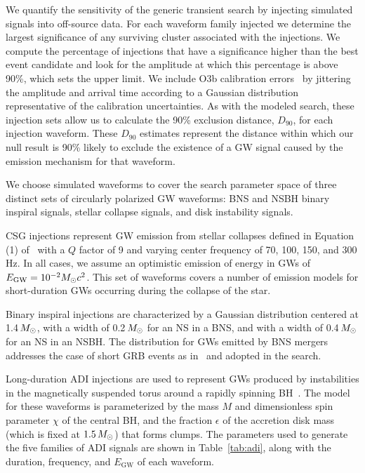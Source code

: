 We quantify the sensitivity of the generic transient search by injecting simulated signals into off-source data.
For each waveform family injected we determine the largest significance of any surviving cluster associated with the injections.
We compute the percentage of injections that have a significance higher than the best event candidate and look for the amplitude at which this percentage is above 90\%, which sets the upper limit.
We include O3b calibration errors~\citep{Acernese_2022, Sun_2021} by jittering the amplitude and arrival time according to a Gaussian distribution representative of the calibration uncertainties.
As with the modeled search, these injection sets allow us to calculate the 90\% exclusion distance, $D_{90}$, for each injection waveform.
These $D_{90}$ estimates represent the distance within which our null result is 90\% likely to exclude the existence of a \ac{GW} signal caused by the emission mechanism for that waveform.

We choose simulated waveforms to cover the search parameter space of three distinct sets of circularly polarized \ac{GW} waveforms: \ac{BNS} and \ac{NSBH} binary inspiral signals, stellar collapse signals, and disk instability signals.

\Ac{CSG} injections represent GW emission from stellar collapses defined in Equation (1) of~\citet{grb_o1} with a $Q$ factor of 9 and varying center frequency of 70, 100, 150, and 300\,Hz.
In all cases, we assume an optimistic emission of energy in \acp{GW} of $E_{\text{GW}} = 10^{-2} M_{\odot} c^2$.
This set of waveforms covers a number of emission models for short-duration \acp{GW} occurring during the collapse of the star.

Binary inspiral injections are characterized by a Gaussian distribution centered at 1.4\,$M_{\odot}$, with a width of 0.2\,$M_{\odot}$ for an \ac{NS} in a \ac{BNS}, and with a width of 0.4\,$M_{\odot}$ for an \ac{NS} in an \ac{NSBH}.
The distribution for \acp{GW} emitted by \ac{BNS} mergers addresses the case of short \ac{GRB} events as in~\citet{grb_o1} and adopted in the \pygrb search.

Long-duration \Ac{ADI} injections are used to represent \acp{GW} produced by instabilities in the magnetically suspended torus around a rapidly spinning \ac{BH}~\citep{vanPutten_2001, vanPutten_2004}.
The model for these waveforms is parameterized by the mass $M$ and dimensionless spin parameter $\chi$ of the central \ac{BH}, and the fraction $\epsilon$ of the  accretion disk mass (which is fixed at $1.5\,M_{\odot}$) that forms clumps.
The parameters used to generate the five families of \ac{ADI} signals are shown in Table~\ref{tab:adi}, along with the duration, frequency, and $E_{\text{GW}}$ of each waveform.

